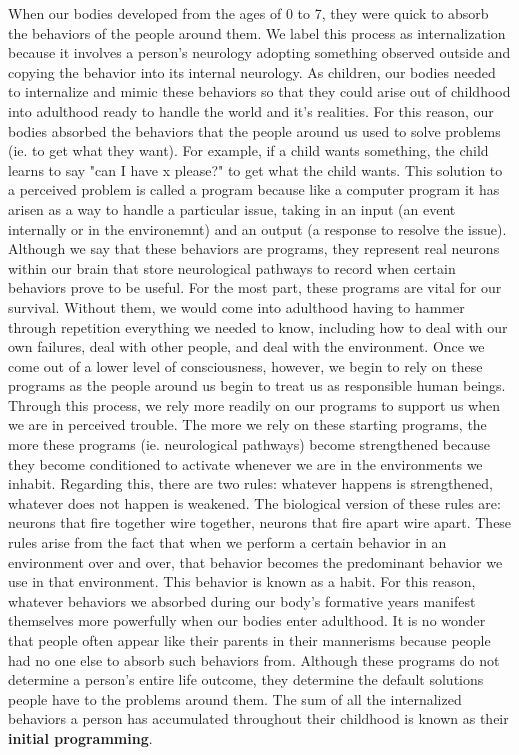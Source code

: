 \documentclass[a4paper, 12pt]{article}
\begin{document}
When our bodies developed from the ages of 0 to 7, they were quick to absorb the behaviors of the people around them. We label this process as internalization because it involves a person's neurology adopting something observed outside and copying the behavior into its internal neurology. As children, our bodies needed to internalize and mimic these behaviors so that they could arise out of childhood into adulthood ready to handle the world and it's realities. For this reason, our bodies absorbed the behaviors that the people around us used to solve problems (ie. to get what they want). For example, if a child wants something, the child learns to say "can I have x please?" to get what the child wants. This solution to a perceived problem is called a program because like a computer program it has arisen as a way to handle a particular issue, taking in an input (an event internally or in the environemnt) and an output (a response to resolve the issue). Although we say that these behaviors are programs, they represent real neurons within our brain that store neurological pathways to record when certain behaviors prove to be useful. For the most part, these programs are vital for our survival. Without them, we would come into adulthood having to hammer through repetition everything we needed to know, including how to deal with our own failures, deal with other people, and deal with the environment. Once we come out of a lower level of consciousness, however, we begin to rely on these programs as the people around us begin to treat us as responsible human beings. Through this process, we rely more readily on our programs to support us when we are in perceived trouble. The more we rely on these starting programs, the more these programs (ie. neurological pathways) become strengthened because they become conditioned to activate whenever we are in the environments we inhabit. Regarding this, there are two rules: whatever happens is strengthened, whatever does not happen is weakened. The biological version of these rules are: neurons that fire together wire together, neurons that fire apart wire apart. These rules arise from the fact that when we perform a certain behavior in an environment over and over, that behavior becomes the predominant behavior we use in that environment. This behavior is known as a habit. For this reason, whatever behaviors we absorbed during our body's formative years manifest themselves more powerfully when our bodies enter adulthood. It is no wonder that people often appear like their parents in their mannerisms because people had no one else to absorb such behaviors from. Although these programs do not determine a person's entire life outcome, they determine the default solutions people have to the problems around them. The sum of all the internalized behaviors a person has accumulated throughout their childhood is known as their \textbf{initial programming}. \\
\end{document}
